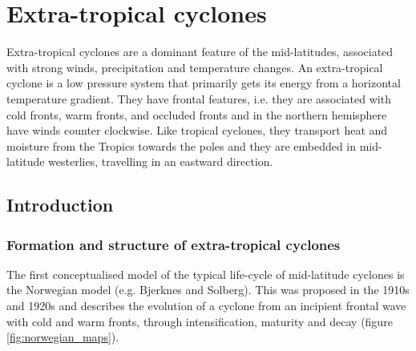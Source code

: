 \chapter{Extra-tropical cyclones}


%
Extra-tropical cyclones are a dominant feature of the mid-latitudes, associated with strong winds, precipitation and temperature changes. An extra-tropical cyclone is a low pressure system that primarily gets its energy from a horizontal temperature gradient. They have frontal features, i.e. they are associated with cold fronts, warm fronts, and occluded fronts and in the northern hemisphere have winds counter clockwise. Like tropical cyclones, they transport heat and moisture from the Tropics towards the poles and they are embedded in mid-latitude westerlies, travelling in an eastward direction.


\section {Introduction}
\subsection {Formation and structure of extra-tropical cyclones}
%

The first conceptualised model of the typical life-cycle of mid-latitude cyclones is the Norwegian model (e.g. Bjerknes and Solberg). This was proposed in the 1910s and 1920s and describes the evolution of a cyclone from an incipient frontal wave with cold and warm fronts, through intensification, maturity and decay (figure \ref {fig:norwegian_maps}).

